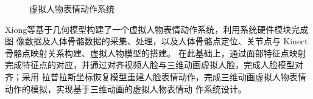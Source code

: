 \documentclass{ctexart}
\begin{document}
\begin{figure}[htbp]	
	\centering	
	\caption{虚拟人物表情动作系统}
\end{figure}
Xiong等\cite{23}基于几何模型构建了一个虚拟人物表情动作系统，利用系统硬件模块完成图
像数据及人体骨骼数据的采集、处理，以及人体骨骼点定位、关节点与 Kinect 骨骼点映射关系构建、虚拟人物模型的搭建。
在此基础上，通过面部特征点映射完成特征点的对应，并通过对齐视频人脸与三维动画虚拟人脸，完成人脸模型对齐；采用
拉普拉斯坐标恢复模型重建人脸表情动作，完成三维动画虚拟人物表情动作的模拟，实现基于三维动画的虚拟人物表情动
作系统设计。
\end{document}
